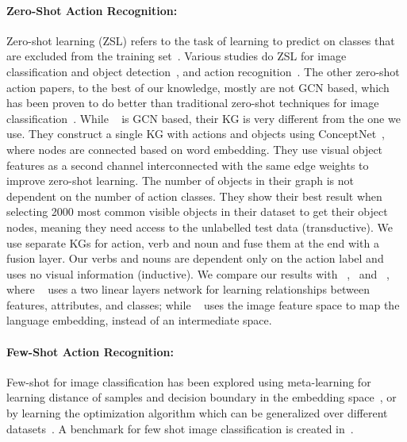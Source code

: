 \paragraph{\bf Zero-Shot Action Recognition:}

Zero-shot learning (ZSL) refers to the task of learning to predict on classes that are excluded from the training set~\cite{palatucci2009zero}. 
Various studies do ZSL for image classification and object detection~\cite{changpinyo2016synthesized,kodirov2015unsupervised,lampert2014attribute,sung2018learning}, and action recognition~\cite{alexiou2016exploring,gan2016recognizing,hahn2019action2vec,jain2015objects2action,mjain2,object_actor,xu2015semantic,xu2016multi,xu2017transductive,zhu2018towards}.
The other zero-shot action papers, to the best of our knowledge, mostly are not GCN based, which has been proven to do better than traditional zero-shot techniques for image classification~\cite{wang2018zero}. While ~\cite{gao2019know} is GCN based, their KG is very different from the one we use. They construct a single KG with actions and objects using ConceptNet~\cite{conceptnet}, where nodes are connected based on word embedding. They use visual object features as a second channel interconnected with the same edge weights to improve zero-shot learning. The number of objects in their graph is not dependent on the number of action classes. They show their best result when selecting 2000 most common visible objects in their dataset to get their object nodes, meaning they need access to the unlabelled test data (transductive). We use separate KGs for action, verb and noun and fuse them at the end with a fusion layer. Our verbs and nouns are dependent only on the action label and uses no visual information (inductive). 
We compare our results with ~\cite{gao2019know},~\cite{romera2015embarrassingly} and ~\cite{zhang2017learning}, where ~\cite{romera2015embarrassingly} uses a two linear layers network for learning relationships between features, attributes, and classes; while ~\cite{zhang2017learning} uses the image feature space to map the language embedding, instead of an intermediate space.


\paragraph{\bf Few-Shot Action Recognition:}
Few-shot for image classification has been explored using meta-learning for learning distance of samples and decision boundary in the embedding space~\cite{ml1,ml2,ml4}, or by learning the  optimization algorithm which can be generalized over different datasets~\cite{ml6,ml5}. A benchmark for few shot image classification is created in~\cite{fsl}. 

